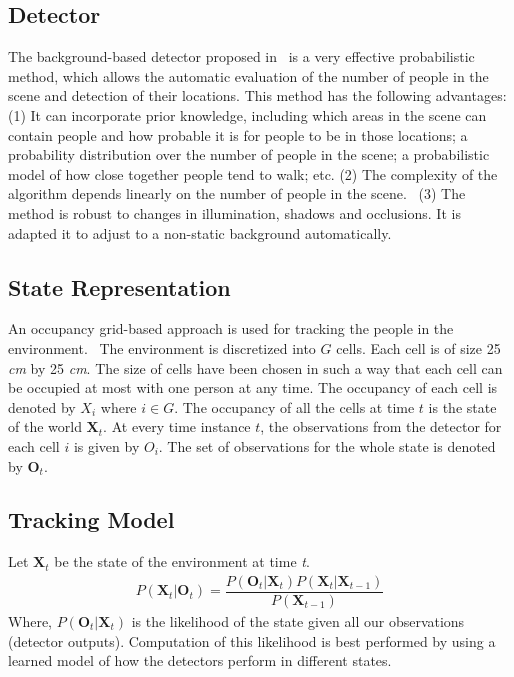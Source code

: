 \subsection{Detector}
The background-based detector proposed in~\cite{englebienne-bnaic} is a very effective probabilistic method, which allows the automatic evaluation of the number of people in the scene and detection of their locations. This method has the following advantages: (1) It can incorporate prior knowledge, including which areas in the scene can contain people and how probable it is for people to be in those locations; a probability distribution over the number of people in the scene; a probabilistic model of how close
together people tend to walk; etc. (2) The complexity of the algorithm depends linearly on the number of people in the scene.%
~(3) The method is robust to changes in illumination, shadows and occlusions. It is adapted it to adjust to a non-static background automatically.

\subsection{State Representation}

An occupancy grid-based approach is used for tracking the people in the environment.%
~The environment is discretized into $G$ cells. Each cell is of size 25 \textit{cm} by 25 \textit{cm}. The size of cells have been chosen in such a way that each cell can be occupied at most with one person at any time. The occupancy of each cell is denoted by $X_{i}$ where $i \in G$. The occupancy of all the cells at time $t$ is the state of the world $\textbf{X}_{t}$. At every time instance $t$, the observations from the detector for each cell $i$ is given by $O_{i}$. The set of observations for the whole state is denoted by $\textbf{O}_{t}$. 

\subsection{Tracking Model}

Let $\textbf{X}_{t}$ be the state of the environment at time \textit{t}.
\begin{align}
P(\textbf{X}_{t} | \textbf{O}_{t}) = \dfrac{P(\textbf{O}_{t} | \textbf{X}_{t}) P(\textbf{X}_{t}|\textbf{X}_{t-1})} {P(\textbf{X}_{t-1})}
\end{align} 
Where, $P(\textbf{O}_{t} | \textbf{X}_{t})$ is the likelihood of the state given all our observations (detector outputs). Computation of this likelihood is best performed by using a learned model of how the detectors perform in different states.

